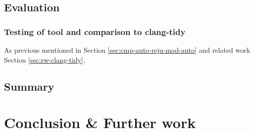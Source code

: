 \documentclass[bsc,frontabs,singlespacing,parskip,deptreport]{infthesis}
\begin{document}
\section{Evaluation}

\subsection{Testing of tool and comparison to clang-tidy}
As previous mentioned in Section \ref{sec:cmp-auto-reju-mod-auto} and related work Section \ref{sec:rw-clang-tidy}, 


        



\section{Summary}


\chapter{Conclusion \& Further work}






\end{document}

